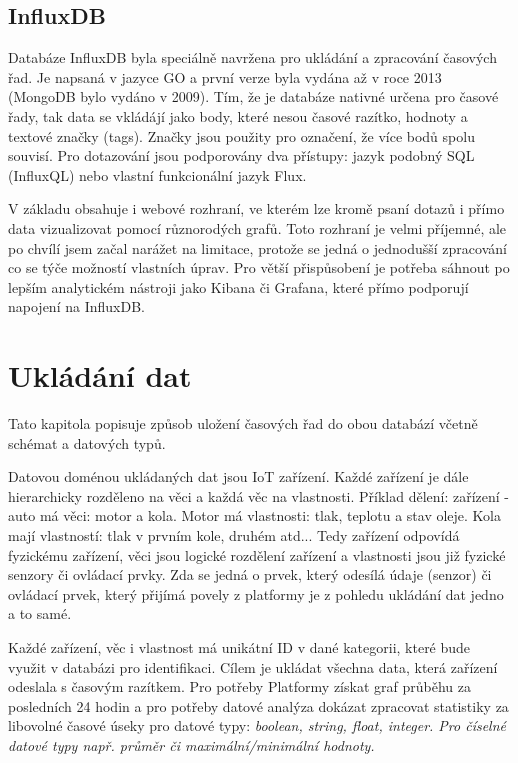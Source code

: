 \documentclass{article}
\begin{document}
\subsection{InfluxDB}

Databáze InfluxDB byla speciálně navržena pro ukládání a zpracování časových řad. Je napsaná v jazyce GO a první verze byla vydána až v roce 2013 (MongoDB bylo vydáno v 2009). Tím, že je databáze nativné určena pro časové řady, tak data se vkládájí jako body, které nesou časové razítko, hodnoty a textové značky (tags). Značky jsou použity pro označení, že více bodů spolu souvisí. Pro dotazování jsou podporovány dva přístupy: jazyk podobný SQL (InfluxQL) nebo vlastní funkcionální jazyk Flux. 

V základu obsahuje i webové rozhraní, ve kterém lze kromě psaní dotazů i přímo data vizualizovat pomocí různorodých grafů. Toto rozhraní je velmi příjemné, ale po chvílí jsem začal narážet na limitace, protože se jedná o jednodušší zpracování co se týče možností vlastních úprav. Pro větší přispůsobení je potřeba sáhnout po lepším analytickém nástroji jako Kibana či Grafana, které přímo podporují napojení na InfluxDB.

\section{Ukládání dat}
Tato kapitola popisuje způsob uložení časových řad do obou databází včetně schémat a datových typů.

Datovou doménou ukládaných dat jsou IoT zařízení. Každé zařízení je dále hierarchicky rozděleno na věci a každá věc na vlastnosti. Příklad dělení: zařízení - auto má věci: motor a kola. Motor má vlastnosti: tlak, teplotu a stav oleje. Kola mají vlastností: tlak v prvním kole, druhém atd... Tedy zařízení odpovídá fyzickému zařízení, věci jsou logické rozdělení zařízení a vlastnosti jsou již fyzické senzory či ovládací prvky. Zda se jedná o prvek, který odesílá údaje (senzor) či ovládací prvek, který přijímá povely z platformy je z pohledu ukládání dat jedno a to samé. 

Každé zařízení, věc i vlastnost má unikátní ID v dané kategorii, které bude využit v databázi pro identifikaci. Cílem je ukládat všechna data, která zařízení odeslala s časovým razítkem. Pro potřeby Platformy získat graf průběhu za posledních 24 hodin a pro potřeby datové analýza dokázat zpracovat statistiky za libovolné časové úseky pro datové typy: \it{boolean}, \it{string}, \it{float}, \it{integer}. Pro číselné datové typy např. průměr či maximální/minimální hodnoty.
\end{document}
